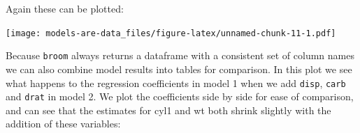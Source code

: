 \documentclass[]{article}
\newenvironment{Shaded}{\begin{snugshade}}{\end{snugshade}}
\newcommand{\DataTypeTok}[1]{\textcolor[rgb]{0.13,0.29,0.53}{#1}}
\newcommand{\FloatTok}[1]{\textcolor[rgb]{0.00,0.00,0.81}{#1}}
\newcommand{\KeywordTok}[1]{\textcolor[rgb]{0.13,0.29,0.53}{\textbf{#1}}}
\newcommand{\NormalTok}[1]{#1}
\newcommand{\OperatorTok}[1]{\textcolor[rgb]{0.81,0.36,0.00}{\textbf{#1}}}
\newcommand{\StringTok}[1]{\textcolor[rgb]{0.31,0.60,0.02}{#1}}
\begin{document}
Again these can be plotted:

\begin{Shaded}
\end{Shaded}

\texttt{[image: models-are-data\_files/figure-latex/unnamed-chunk-11-1.pdf]}

Because \texttt{broom} always returns a dataframe with a consistent set of column names
we can also combine model results into tables for comparison. In this plot we
see what happens to the regression coefficients in model 1 when we add \texttt{disp},
\texttt{carb} and \texttt{drat} in model 2. We plot the coefficients side by side for ease of
comparison, and can see that the estimates for cyl1 and wt both shrink slightly
with the addition of these variables:
\end{document}
